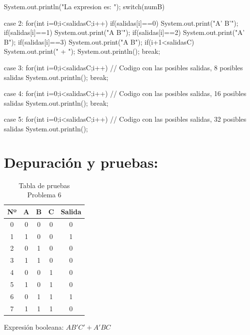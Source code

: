 \documentclass{IEEEcsmag}
\begin{document}
\begin{javaCode}
System.out.println("La expresion es: ");
        switch(numB){
            case 2:{
           for(int i=0;i<salidasC;i++){
               if(salidas[i]==0){
                   System.out.print("A' B'");
               }
               if(salidas[i]==1){
                   System.out.print("A B'");
               }
               if(salidas[i]==2){
                   System.out.print("A' B");
               }
               if(salidas[i]==3){
                   System.out.print("A B");
               }
               if(i+1<salidasC){
                   System.out.print(" + ");
               }
            }
            System.out.println();
            }
            break;
            
            case 3:{
           for(int i=0;i<salidasC;i++){
               // Codigo con las posibles salidas, 8 posibles salidas
            }System.out.println();}
            break;
            
            case 4:{
           for(int i=0;i<salidasC;i++){
           // Codigo con las posibles salidas, 16 posibles salidas
            }System.out.println();}
            break;
            
            case 5:{
           for(int i=0;i<salidasC;i++){
               // Codigo con las posibles salidas, 32 posibles salidas
               }
            } System.out.println();}
        
\end{javaCode}

\section*{Depuración y pruebas:}

\begin{table}[h]
\centering
\begin{tabular}{|c|c|c|c|c|}
\hline
\textbf{Nº} & \textbf{A} & \textbf{B} & \textbf{C} & \textbf{Salida} \\
\hline
0 & 0 & 0 & 0 & 0 \\
1 & 1 & 0 & 0 & 1 \\
2 & 0 & 1 & 0 & 0 \\
3 & 1 & 1 & 0 & 0 \\
4 & 0 & 0 & 1 & 0 \\
5 & 1 & 0 & 1 & 0 \\
6 & 0 & 1 & 1 & 1 \\
7 & 1 & 1 & 1 & 0 \\

\hline
\end{tabular}
\caption{Tabla de pruebas Problema 6}
\end{table}
Expresión booleana: $AB'C' + A'BC$
\end{document}
